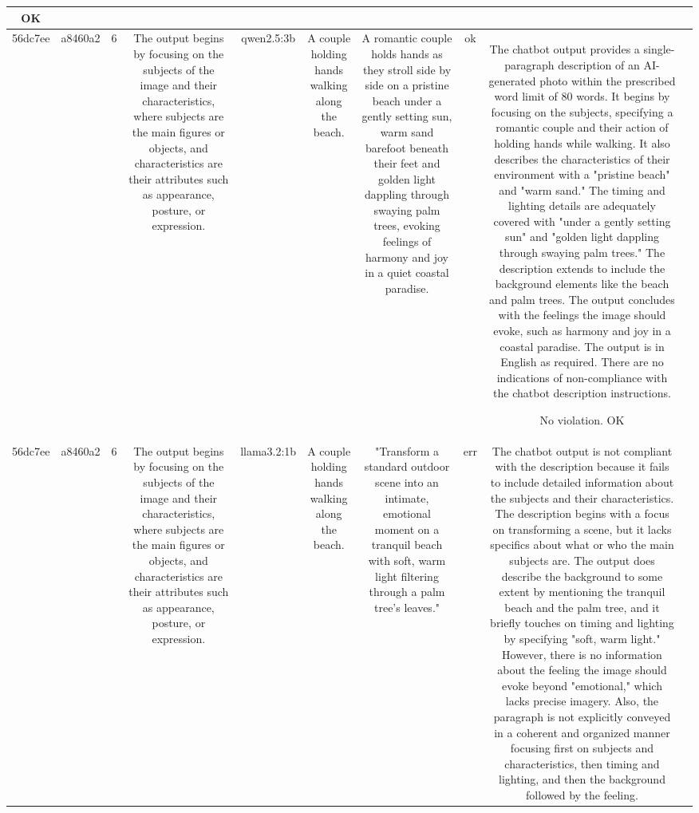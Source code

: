 \begin{table}[h!]
\begin{tabular}{|c|c|c|c|c|c|c|c|c|c|}
OK & \\
\hline
56dc7ee & a8460a2 & 6 & The output begins by focusing on the subjects of the image and their characteristics, where subjects are the main figures or objects, and characteristics are their attributes such as appearance, posture, or expression. & qwen2.5:3b & A couple holding hands walking along the beach. & A romantic couple holds hands as they stroll side by side on a pristine beach under a gently setting sun, warm sand barefoot beneath their feet and golden light dappling through swaying palm trees, evoking feelings of harmony and joy in a quiet coastal paradise. & ok & The chatbot output provides a single-paragraph description of an AI-generated photo within the prescribed word limit of 80 words. It begins by focusing on the subjects, specifying a romantic couple and their action of holding hands while walking. It also describes the characteristics of their environment with a "pristine beach" and "warm sand." The timing and lighting details are adequately covered with "under a gently setting sun" and "golden light dappling through swaying palm trees." The description extends to include the background elements like the beach and palm trees. The output concludes with the feelings the image should evoke, such as harmony and joy in a coastal paradise. The output is in English as required. There are no indications of non-compliance with the chatbot description instructions.

No violation.
OK & \\
\hline
56dc7ee & a8460a2 & 6 & The output begins by focusing on the subjects of the image and their characteristics, where subjects are the main figures or objects, and characteristics are their attributes such as appearance, posture, or expression. & llama3.2:1b & A couple holding hands walking along the beach. & "Transform a standard outdoor scene into an intimate, emotional moment on a tranquil beach with soft, warm light filtering through a palm tree's leaves." & err & The chatbot output is not compliant with the description because it fails to include detailed information about the subjects and their characteristics. The description begins with a focus on transforming a scene, but it lacks specifics about what or who the main subjects are. The output does describe the background to some extent by mentioning the tranquil beach and the palm tree, and it briefly touches on timing and lighting by specifying "soft, warm light." However, there is no information about the feeling the image should evoke beyond "emotional," which lacks precise imagery. Also, the paragraph is not explicitly conveyed in a coherent and organized manner focusing first on subjects and characteristics, then timing and lighting, and then the background followed by the feeling.


\end{tabular}
\end{table}
